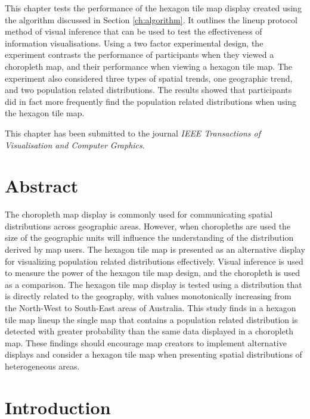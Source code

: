 \documentclass{monashthesis}
\begin{document}
This chapter tests the performance of the hexagon tile map display created using the algorithm discussed in Section \ref{ch:algorithm}.
It outlines the lineup protocol method of visual inference that can be used to test the effectiveness of information visualisations.
Using a two factor experimental design, the experiment contrasts the performance of participants when they viewed a choropleth map, and their performance when viewing a hexagon tile map.
The experiment also considered three types of spatial trends, one geographic trend, and two population related distributions.
The results showed that participants did in fact more frequently find the population related distributions when using the hexagon tile map.

This chapter has been submitted to the journal \emph{IEEE Transactions of Visualisation and Computer Graphics}.



\hypertarget{abstract-3}{%
\section*{Abstract}\label{abstract-3}}

The choropleth map display is commonly used for communicating spatial distributions across geographic areas. However, when choropleths are used the size of the geographic units will influence the understanding of the distribution derived by map users. The hexagon tile map is presented as an alternative display for visualizing population related distributions effectively. Visual inference is used to measure the power of the hexagon tile map design, and the choropleth is used as a comparison. The hexagon tile map display is tested using a distribution that is directly related to the geography, with values monotonically increasing from the North-West to South-East areas of Australia. This study finds in a hexagon tile map lineup the single map that contains a population related distribution is detected with greater probability than the same data displayed in a choropleth map. These findings should encourage map creators to implement alternative displays and consider a hexagon tile map when presenting spatial distributions of heterogeneous areas.

\hypertarget{introduction-2}{%
\section{Introduction}\label{introduction-2}}
\end{document}
